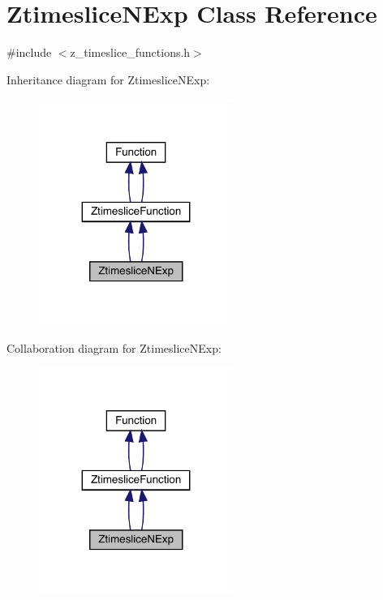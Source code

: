 \hypertarget{classZtimesliceNExp}{}\section{Ztimeslice\+N\+Exp Class Reference}
\label{classZtimesliceNExp}


{\ttfamily \#include $<$z\+\_\+timeslice\+\_\+functions.\+h$>$}



Inheritance diagram for Ztimeslice\+N\+Exp\+:
\nopagebreak
\begin{figure}[H]
\begin{center}
\leavevmode
\includegraphics[width=179pt]{d7/ddf/classZtimesliceNExp__inherit__graph}
\end{center}
\end{figure}


Collaboration diagram for Ztimeslice\+N\+Exp\+:
\nopagebreak
\begin{figure}[H]
\begin{center}
\leavevmode
\includegraphics[width=179pt]{da/d93/classZtimesliceNExp__coll__graph}
\end{center}
\end{figure}
